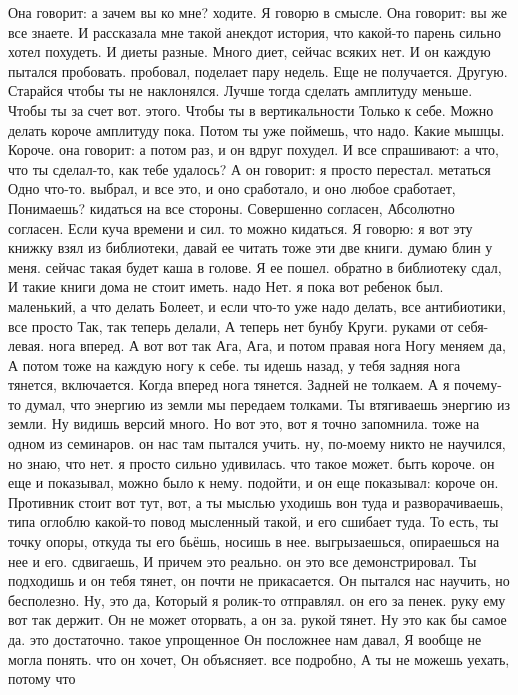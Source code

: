 Она говорит: а зачем вы ко мне?
ходите.
Я говорю в смысле.
Она говорит: вы же все знаете.
И рассказала мне такой анекдот история, что какой-то парень сильно хотел похудеть.
И диеты разные.
Много диет, сейчас всяких нет.
И он каждую пытался пробовать. пробовал, поделает пару недель.
Еще не получается.
Другую.
Старайся чтобы ты не наклонялся.
Лучше тогда сделать амплитуду меньше.
Чтобы ты за счет вот.
этого.
Чтобы ты в вертикальности
Только к себе.
Можно делать короче амплитуду пока.
Потом ты уже поймешь, что надо.
Какие мышцы.
Короче. она говорит: а потом раз, и он вдруг похудел.
И все спрашивают: а что, что ты сделал-то, как тебе удалось?
А он говорит: я просто перестал.
метаться Одно что-то.
выбрал, и все это, и оно сработало, и оно любое сработает, Понимаешь?
кидаться на все стороны. Совершенно согласен, Абсолютно согласен.
Если куча времени и сил.
то можно кидаться. Я говорю: я вот эту книжку взял из библиотеки, давай ее читать тоже эти две книги. думаю блин у меня.
сейчас такая будет каша в голове. Я ее пошел.
обратно в библиотеку сдал, И такие книги дома не стоит иметь. надо Нет.
я пока вот ребенок был.
маленький, а что делать Болеет, и если что-то уже надо делать,
все антибиотики, все просто Так, так теперь делали, А теперь нет бунбу Круги.
руками от себя- левая.
нога вперед. А вот вот так Ага, Ага, и потом правая нога Ногу меняем да, А потом тоже на каждую ногу к себе.
ты идешь назад, у тебя задняя нога тянется, включается.
Когда вперед нога тянется.
Задней не толкаем.
А я почему-то думал, что энергию из земли мы передаем толками.
Ты втягиваешь энергию из земли.
Ну видишь версий много.
Но вот это, вот я точно запомнила.
тоже на одном из семинаров. он нас там пытался учить. ну, по-моему никто не научился, но знаю, что нет. я просто сильно удивилась.
что такое может.
быть короче. он еще и показывал, можно было к нему.
подойти, и он еще показывал: короче он.
Противник стоит вот тут, вот, а ты мыслью уходишь вон туда и разворачиваешь, типа оглоблю какой-то повод мысленный такой, и его сшибает туда. То есть, ты точку опоры, откуда ты его бьёшь, носишь в нее.
выгрызаешься, опираешься на нее и его.
сдвигаешь, И причем это реально. он это все демонстрировал. Ты подходишь и он тебя тянет, он почти не прикасается.
Он пытался нас научить, но бесполезно. Ну, это да, Который я ролик-то отправлял. он его за пенек. руку ему вот так держит. Он не может оторвать, а он за.
рукой тянет. Ну это как бы самое да. это достаточно. такое упрощенное Он посложнее нам давал, Я вообще не могла понять.
что он хочет, Он объясняет.
все подробно, А ты не можешь уехать, потому что
